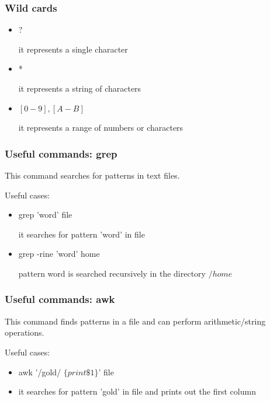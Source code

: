\begin{frame}
	\frametitle{Wild cards}

	\begin{itemize}
        \item ?

        it represents a single character

        \item *

        it represents a string of characters
 
        \item $\left[0-9\right], \left[A-B\right]$

        it represents a range of numbers or characters
	\end{itemize}
        

\end{frame}

\begin{frame}
	\frametitle{Useful commands: grep}
      This command searches for patterns in text files.

Useful cases:
	\begin{itemize}
        \item grep 'word' file

        it searches for pattern 'word' in file

        \item grep -rine 'word' home

        pattern word is searched recursively in the directory  $/home$
 
	\end{itemize}

\end{frame}

\begin{frame}
	\frametitle{Useful commands: awk}
This command finds patterns in a file and can perform arithmetic/string operations.

Useful cases:
	\begin{itemize}
        \item awk '/gold/ $\{print  \$1 \} $' file

        \item it searches for pattern 'gold' in file and prints out the first column 

	\end{itemize}

\end{frame}

